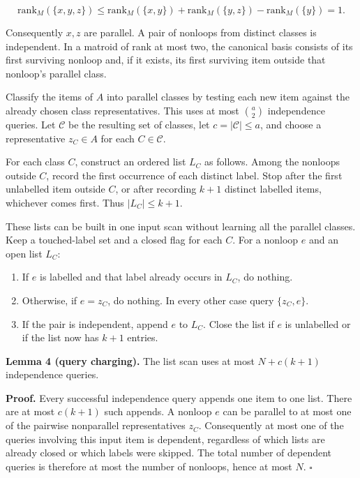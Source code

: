 \[
\mathrm{rank}_M(\{x,y,z\})
\le \mathrm{rank}_M(\{x,y\})+
\mathrm{rank}_M(\{y,z\})-\mathrm{rank}_M(\{y\})=1.
\]

Consequently \(x,z\) are parallel. A pair of nonloops from distinct classes is independent. In a matroid of rank at most two, the canonical basis consists of its first surviving nonloop and, if it exists, its first surviving item outside that nonloop's parallel class.

Classify the items of \(A\) into parallel classes by testing each new item against the already chosen class representatives. This uses at most \(\binom a2\) independence queries. Let \(\mathcal C\) be the resulting set of classes, let \(c=|\mathcal C|\le a\), and choose a representative \(z_C\in A\) for each \(C\in\mathcal C\).

For each class \(C\), construct an ordered list \(L_C\) as follows. Among the nonloops outside \(C\), record the first occurrence of each distinct label. Stop after the first unlabelled item outside \(C\), or after recording \(k+1\) distinct labelled items, whichever comes first. Thus \(|L_C|\le k+1\).

These lists can be built in one input scan without learning all the parallel classes. Keep a touched-label set and a closed flag for each \(C\). For a nonloop \(e\) and an open list \(L_C\):

\begin{enumerate}
\def\labelenumi{\arabic{enumi}.}
\tightlist
\item
  If \(e\) is labelled and that label already occurs in \(L_C\), do nothing.
\item
  Otherwise, if \(e=z_C\), do nothing. In every other case query \(\{z_C,e\}\).
\item
  If the pair is independent, append \(e\) to \(L_C\). Close the list if \(e\) is unlabelled or if the list now has \(k+1\) entries.
\end{enumerate}

\textbf{Lemma 4 (query charging).} The list scan uses at most \(N+c(k+1)\) independence queries.

\textbf{Proof.} Every successful independence query appends one item to one list. There are at most \(c(k+1)\) such appends. A nonloop \(e\) can be parallel to at most one of the pairwise nonparallel representatives \(z_C\). Consequently at most one of the queries involving this input item is dependent, regardless of which lists are already closed or which labels were skipped. The total number of dependent queries is therefore at most the number of nonloops, hence at most \(N\). \(\square\)

